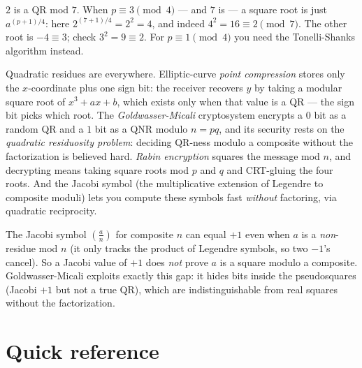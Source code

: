 \begin{example}
\label{ch40:ex-sqrt}
$2$ is a QR mod $7$. When $p\equiv 3\pmod 4$ --- and $7$ is --- a square root is just $a^{(p+1)/4}$:
here $2^{(7+1)/4}=2^2=4$, and indeed $4^2=16\equiv 2\pmod 7$. The other root is $-4\equiv 3$; check
$3^2 = 9\equiv 2$. For $p\equiv 1\pmod 4$ you need the Tonelli-Shanks algorithm instead.
\end{example}

\begin{applicationbox}
Quadratic residues are everywhere. Elliptic-curve \emph{point compression} stores only the
$x$-coordinate plus one sign bit: the receiver recovers $y$ by taking a modular square root of
$x^3+ax+b$, which exists only when that value is a QR --- the sign bit picks which root. The
\emph{Goldwasser-Micali} cryptosystem encrypts a $0$ bit as a random QR and a $1$ bit as a
QNR modulo $n=pq$, and its security rests on the \emph{quadratic residuosity problem}: deciding
QR-ness modulo a composite without the factorization is believed hard. \emph{Rabin encryption}
squares the message mod $n$, and decrypting means taking square roots mod $p$ and $q$ and CRT-gluing
the four roots. And the Jacobi symbol (the multiplicative extension of Legendre to composite moduli)
lets you compute these symbols fast \emph{without} factoring, via quadratic reciprocity.
\end{applicationbox}

\begin{trapbox}
The Jacobi symbol $\left(\tfrac{a}{n}\right)$ for composite $n$ can equal $+1$ even when $a$ is a
\emph{non}-residue mod $n$ (it only tracks the product of Legendre symbols, so two $-1$'s cancel). So
a Jacobi value of $+1$ does \emph{not} prove $a$ is a square modulo a composite. Goldwasser-Micali
exploits exactly this gap: it hides bits inside the pseudosquares (Jacobi $+1$ but not a true QR),
which are indistinguishable from real squares without the factorization.
\end{trapbox}

\section{Quick reference}
\label{ch40:tables}

